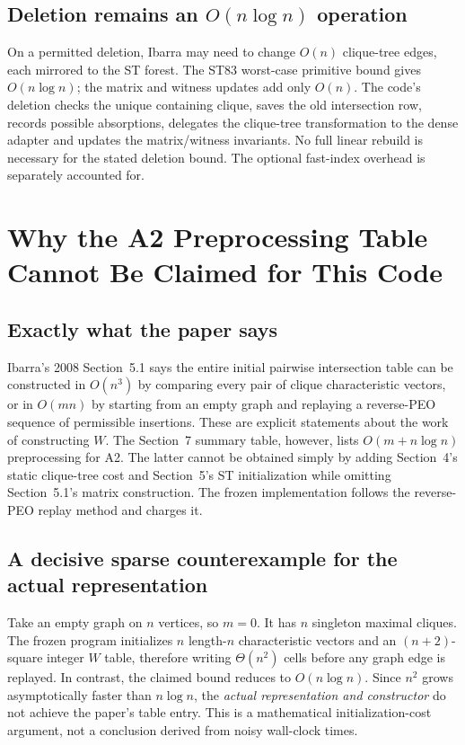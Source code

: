 \subsection{Deletion remains an \(O(n\log n)\) operation}
On a permitted deletion, Ibarra may need to change \(O(n)\) clique-tree edges, each mirrored to the ST forest.  The ST83 worst-case primitive bound gives \(O(n\log n)\); the matrix and witness updates add only \(O(n)\).  The code's deletion checks the unique containing clique, saves the old intersection row, records possible absorptions, delegates the clique-tree transformation to the dense adapter and updates the matrix/witness invariants.  No full linear rebuild is necessary for the stated deletion bound.  The optional fast-index overhead is separately accounted for.

\section{Why the A2 Preprocessing Table Cannot Be Claimed for This Code}
\label{sec:a2-preprocess-full}
\subsection{Exactly what the paper says}
Ibarra's 2008 Section~5.1 says the entire initial pairwise intersection table can be constructed in \(O(n^3)\) by comparing every pair of clique characteristic vectors, or in \(O(mn)\) by starting from an empty graph and replaying a reverse-PEO sequence of permissible insertions.  These are explicit statements about the work of constructing \(W\).  The Section~7 summary table, however, lists \(O(m+n\log n)\) preprocessing for A2.  The latter cannot be obtained simply by adding Section~4's static clique-tree cost and Section~5's ST initialization while omitting Section~5.1's matrix construction.  The frozen implementation follows the reverse-PEO replay method and charges it.

\subsection{A decisive sparse counterexample for the actual representation}
Take an empty graph on \(n\) vertices, so \(m=0\).  It has \(n\) singleton maximal cliques.  The frozen program initializes \(n\) length-\(n\) characteristic vectors and an \((n+2)\)-square integer \(W\) table, therefore writing \(\Theta(n^2)\) cells before any graph edge is replayed.  In contrast, the claimed bound reduces to \(O(n\log n)\).  Since \(n^2\) grows asymptotically faster than \(n\log n\), the \emph{actual representation and constructor} do not achieve the paper's table entry.  This is a mathematical initialization-cost argument, not a conclusion derived from noisy wall-clock times.

